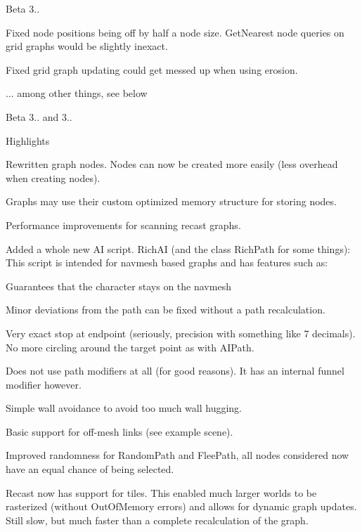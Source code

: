 \begin{DoxyItemize}
\item Beta 3..
\begin{DoxyItemize}
\item Fixed node positions being off by half a node size. Get\+Nearest node queries on grid graphs would be slightly inexact.
\item Fixed grid graph updating could get messed up when using erosion.
\item ... among other things, see below
\end{DoxyItemize}
\item Beta 3.. and 3..
\begin{DoxyItemize}
\item Highlights
\begin{DoxyItemize}
\item Rewritten graph nodes. Nodes can now be created more easily (less overhead when creating nodes).
\item Graphs may use their custom optimized memory structure for storing nodes.
\item Performance improvements for scanning recast graphs.
\item Added a whole new AI script. Rich\+AI (and the class Rich\+Path for some things)\+: This script is intended for navmesh based graphs and has features such as\+:
\begin{DoxyItemize}
\item Guarantees that the character stays on the navmesh
\item Minor deviations from the path can be fixed without a path recalculation.
\item Very exact stop at endpoint (seriously, precision with something like 7 decimals). No more circling around the target point as with A\+I\+Path.
\item Does not use path modifiers at all (for good reasons). It has an internal funnel modifier however.
\item Simple wall avoidance to avoid too much wall hugging.
\item Basic support for off-\/mesh links (see example scene).
\end{DoxyItemize}
\item Improved randomness for Random\+Path and Flee\+Path, all nodes considered now have an equal chance of being selected.
\item Recast now has support for tiles. This enabled much larger worlds to be rasterized (without Out\+Of\+Memory errors) and allows for dynamic graph updates. Still slow, but much faster than a complete recalculation of the graph.

\end{DoxyItemize}
\end{DoxyItemize}
\end{DoxyItemize}
